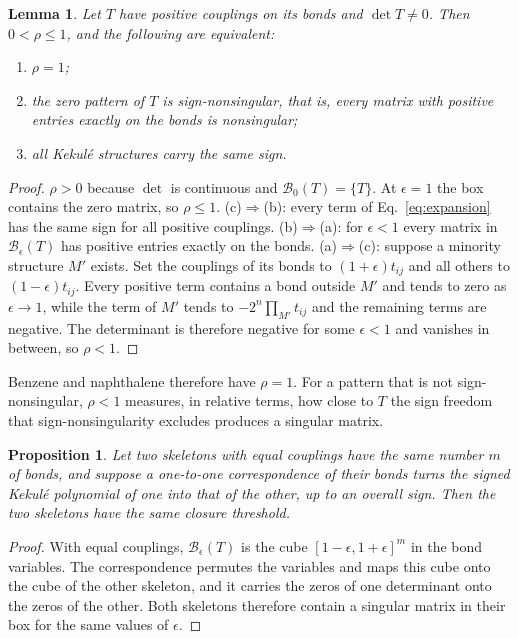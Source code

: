 \documentclass[11pt]{article}
\newtheorem{proposition}{Proposition}
\newtheorem{lemma}{Lemma}
\newcommand{\Bx}{\mathcal{B}}
\begin{document}
\begin{lemma}
\label{lem:range}
Let $T$ have positive couplings on its bonds and $\det T\neq0$. Then $0<\rho\le1$, and the following are equivalent:
\begin{enumerate}
\item[(a)] $\rho=1$;
\item[(b)] the zero pattern of $T$ is sign-nonsingular, that is, every matrix with positive entries exactly on the bonds is nonsingular;
\item[(c)] all Kekul\'e structures carry the same sign.
\end{enumerate}
\end{lemma}

\begin{proof}
$\rho>0$ because $\det$ is continuous and $\Bx_0(T)=\{T\}$. At $\epsilon=1$ the box contains the zero matrix, so $\rho\le1$. (c)$\Rightarrow$(b): every term of Eq.~\eqref{eq:expansion} has the same sign for all positive couplings. (b)$\Rightarrow$(a): for $\epsilon<1$ every matrix in $\Bx_\epsilon(T)$ has positive entries exactly on the bonds. (a)$\Rightarrow$(c): suppose a minority structure $M'$ exists. Set the couplings of its bonds to $(1+\epsilon)t_{ij}$ and all others to $(1-\epsilon)t_{ij}$. Every positive term contains a bond outside $M'$ and tends to zero as $\epsilon\to1$, while the term of $M'$ tends to $-2^n\prod_{M'}t_{ij}$ and the remaining terms are negative. The determinant is therefore negative for some $\epsilon<1$ and vanishes in between, so $\rho<1$.
\end{proof}

Benzene and naphthalene therefore have $\rho=1$. For a pattern that is not sign-nonsingular, $\rho<1$ measures, in relative terms, how close to $T$ the sign freedom that sign-nonsingularity excludes produces a singular matrix.

\begin{proposition}
\label{prop:inv}
Let two skeletons with equal couplings have the same number $m$ of bonds, and suppose a one-to-one correspondence of their bonds turns the signed Kekul\'e polynomial of one into that of the other, up to an overall sign. Then the two skeletons have the same closure threshold.
\end{proposition}

\begin{proof}
With equal couplings, $\Bx_\epsilon(T)$ is the cube $[1-\epsilon,1+\epsilon]^m$ in the bond variables. The correspondence permutes the variables and maps this cube onto the cube of the other skeleton, and it carries the zeros of one determinant onto the zeros of the other. Both skeletons therefore contain a singular matrix in their box for the same values of $\epsilon$.
\end{proof}
\end{document}
